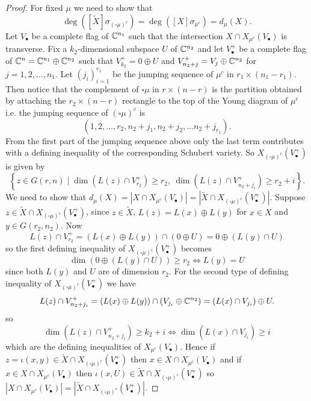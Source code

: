 \begin{proof}
    For fixed $\mu$ we need to show that 
    \[
        \deg([\tilde{X}] \sigma_{(\square \mu)^c}) = \deg([X] \sigma_{\mu^c}) = d_\mu(X).
    \]
    Let $V_\bullet$ be a complete flag of ${\mathbb C}^{n_1}$ such that the intersection $X \cap X_{\mu^c}(V_\bullet)$ is transverse. Fix a $k_2$-dimensional subspace $U$ of ${\mathbb C}^{n_2}$ and let $V^+_\bullet$ be a complete flag of ${\mathbb C}^n = {\mathbb C}^{n_1} \oplus {\mathbb C}^{n_2}$ such that $V^+_{k_2} = 0 \oplus U$ and  $V^+_{n_2 + j} = V_j \oplus {\mathbb C}^{n_2}$ for $j = 1, 2, \dots, n_1$. Let $(j_i)_{i=1}^{r_1}$ be the jumping sequence of $\mu^c$ in $r_1 \times (n_1-r_1)$. Then notice that the complement of $\square \mu$ in $r \times (n-r)$ is the partition obtained by attaching the $r_2 \times (n-r)$ rectangle to the top of the Young diagram of $\mu^c$ i.e. the jumping sequence of $(\square \mu)^c$ is
    \begin{equation*}
        (1,2,\dots, r_2, n_2 + j_1, n_2 + j_2, \dots n_2 + j_{r_1}).
    \end{equation*}
    From the first part of the jumping sequence above only the last term contributes with a defining inequality of the corresponding Schubert variety. So $X_{(\square \mu)^c}(V^+_\bullet)$ is given by 
    \begin{equation*}
        \left\{z \in G(r,n) \mid \dim(L(z) \cap V^+_{r_2}) \geq r_2, \ \dim(L(z) \cap V^+_{n_2+j_i}) \geq r_2 + i\right\}.
    \end{equation*}
    We need to show that $d_\mu(X) = |X \cap X_{\mu^c}(V_\bullet)| = |\tilde{X} \cap X_{(\square \mu)^c}(V^+_\bullet)|$. Suppose $z \in \tilde{X} \cap X_{(\square \mu)^c}(V^+_\bullet)$, since $z \in \tilde{X}$,  $L(z) = L(x) \oplus L(y)$ for $x \in X$ and $y \in G(r_2,n_2)$. Now
    \begin{equation*}
        L(z) \cap V^+_{r_2} = (L(x) \oplus L(y)) \cap (0 \oplus U) = 0 \oplus (L(y) \cap U)
    \end{equation*}
    so the first defining inequality of $X_{(\square \mu)^c}(V^+_\bullet)$ becomes 
    \begin{equation*}
        \dim(0\oplus (L(y) \cap U)) \geq r_2 \iff L(y) = U
    \end{equation*}
    since both $L(y)$ and $U$ are of dimension $r_2$. For the second type of defining inequality of $X_{(\square \mu)^c}(V^+_\bullet)$ we have
    \begin{equation*}
        L(z) \cap V^+_{n_2 + j_i} = (L(x) \oplus L(y)) \cap (V_{j_i} \oplus {\mathbb C}^{n_2}) = (L(x) \cap V_{j_i}) \oplus U.
    \end{equation*}
    so 
    \begin{equation*}
        \dim(L(z) \cap V^+_{n_2 + j_i}) \geq k_2 + i \iff \dim(L(x) \cap V_{j_i}) \geq i
    \end{equation*}
    which are the defining inequalities of $X_{\mu^c}(V_\bullet)$. Hence if $z = \iota(x,y) \in \tilde{X} \cap X_{(\square \mu)^c}(V^+_\bullet)$ then $x \in X \cap X_{\mu^c}(V_\bullet)$ and if $x \in X \cap X_{\mu^c}(V_\bullet)$ then $\iota(x,U) \in \tilde{X} \cap X_{(\square \mu)^c}(V^+_\bullet)$ so $|X \cap X_{\mu^c}(V_\bullet)| = |\tilde{X} \cap X_{(\square \mu)^c}(V^+_\bullet)|$.
\end{proof}

